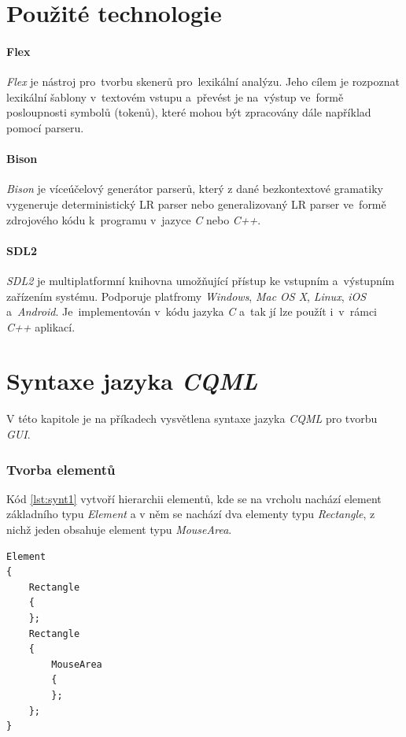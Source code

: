 \documentclass[11pt,twoside,a4paper]{book}
\begin{document}
\clearpage
\chapter{\label{CH:APB}Použité technologie }

\subsubsection{\label{SEC:FLEX}Flex}
\textit{Flex} je nástroj pro~tvorbu skenerů pro~lexikální analýzu. Jeho cílem je rozpoznat lexikální šablony v~textovém vstupu a~převést je na~výstup ve~formě posloupnosti symbolů (tokenů), které mohou být zpracovány dále například pomocí parseru.
\subsubsection{\label{SEC:Bison}Bison}
\textit{Bison} je víceúčelový generátor parserů, který z dané bezkontextové gramatiky vygeneruje deterministický LR parser nebo generalizovaný LR parser ve~formě zdrojového kódu k~programu v~jazyce \textit{C} nebo \textit{C++}.
\subsubsection{SDL2}
\textit{SDL2} je multiplatformní knihovna umožňující přístup ke vstupním a~výstupním zařízením systému. Podporuje platfromy \textit{Windows}, \textit{Mac OS X}, \textit{Linux}, \textit{iOS} a~\textit{Android}. Je~implementován v~kódu jazyka \textit{C} a~tak jí lze použít i~v~rámci \textit{C++} aplikací.


\chapter{\label{CH:APF}Syntaxe jazyka \textit{CQML}}
V této kapitole je na příkadech vysvětlena syntaxe jazyka \textit{CQML} pro tvorbu \textit{GUI}.

\subsection{Tvorba elementů}
Kód \ref{lst:synt1} vytvoří hierarchii elementů, kde se na vrcholu nachází element základního typu \textit{Element} a v něm se nachází dva elementy typu \textit{Rectangle}, z nichž jeden obsahuje element typu \textit{MouseArea}.
\begin{lstlisting}[frame=single,caption=Syntaxe pro tvorbu hierarchie elementů.,label=lst:synt1]
Element
{
	Rectangle
	{
	};
	Rectangle
	{
		MouseArea
		{
		};
	};
}
\end{lstlisting}
\end{document}
